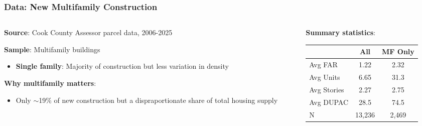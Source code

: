 \begin{frame}
    \frametitle{Data: New Multifamily Construction}
    
    \begin{columns}[T]
    \begin{column}{0.55\textwidth}
    \textbf{Source}: Cook County Assessor parcel data, 2006-2025
    
    \vspace{0.5em}
    \textbf{Sample}: Multifamily buildings
    \begin{itemize}
        \item \textbf{Single family}: Majority of construction but less variation in density
    \end{itemize}
    
    \vspace{0.5em}
    \textbf{Why multifamily matters}: 
    \begin{itemize}
        \item Only $\sim$19\% of new construction but a dispraportionate share of total housing supply
    \end{itemize}
    \end{column}
    
    \begin{column}{0.43\textwidth}
    \textbf{Summary statistics}:
    \vspace{0.3em}
    \small
    \begin{tabular}{lcc}
    \toprule
     & All & MF Only \\
    \midrule
    Avg FAR & 1.22 & 2.32 \\
    Avg Units & 6.65 & 31.3 \\
    Avg Stories & 2.27 & 2.75 \\
    Avg DUPAC & 28.5 & 74.5 \\
    \midrule
    N & 13,236 & 2,469 \\
    \bottomrule
    \end{tabular}
    \end{column}
    \end{columns}
\end{frame}


